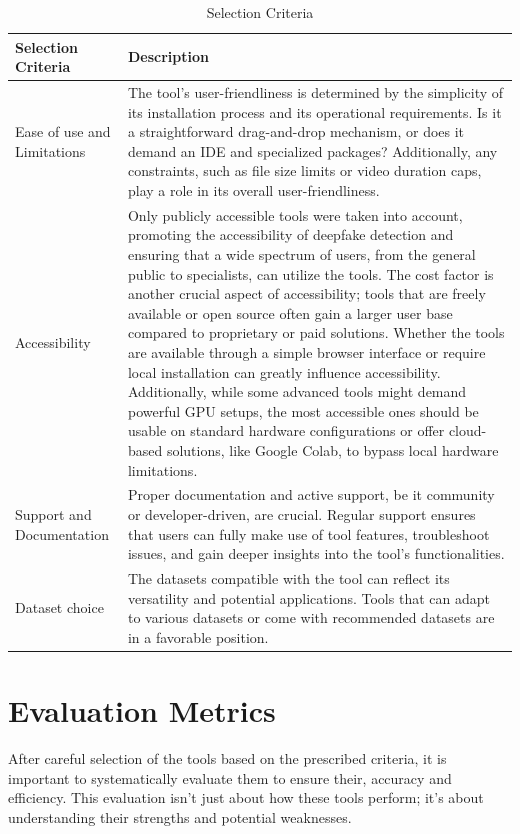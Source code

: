 \begin{table}[htpb]
	\caption{Selection Criteria}\label{tab:selection_criteria}
	\centering
	\small
	\begin{tabularx}{\textwidth}{l X}
		\toprule
		\textbf{Selection Criteria} & \textbf{Description}                       \\
		\midrule
		Ease of use and Limitations & The tool's user-friendliness is determined
		by the simplicity of its installation process and its operational
		requirements. Is it a straightforward drag-and-drop mechanism, or does
		it demand an \ac{IDE} and specialized packages? Additionally, any constraints, such
		as file size limits or video duration caps, play a role in its overall
		user-friendliness.                                                       \\
		\addlinespace
		Accessibility               & Only publicly accessible tools were taken
		into account, promoting the accessibility of deepfake detection and
		ensuring that a wide spectrum of users, from the general public to
		specialists, can utilize the tools. The cost factor is another crucial
		aspect of accessibility; tools that are freely available or open
		source often gain a larger user base compared to proprietary or paid
		solutions. Whether the tools are available through a simple browser
		interface or require local installation can greatly influence
		accessibility. Additionally, while some advanced tools might demand
		powerful GPU setups, the most accessible ones should be usable on
		standard hardware configurations or offer cloud-based solutions, like
		Google Colab, to bypass local hardware limitations.                      \\
		\addlinespace
		Support and Documentation   & Proper documentation and active support,
		be it community or developer-driven, are crucial. Regular support
		ensures that users can fully make use of tool features, troubleshoot issues,
		and gain deeper insights into the tool's functionalities.                \\
		\addlinespace
		Dataset choice              & The datasets compatible with the tool
		can reflect its versatility and potential applications.
		Tools that can adapt to various datasets or come with recommended
		datasets are in a favorable position.                                    \\
		\bottomrule
	\end{tabularx}
\end{table}

\section{Evaluation Metrics}
After careful selection of the tools based on the prescribed criteria, it is
important to systematically evaluate them to ensure their, accuracy
and efficiency. This evaluation isn't just about how these tools perform; it's
about understanding their strengths and potential weaknesses.

